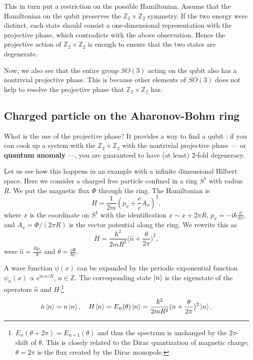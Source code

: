 \documentclass[
]{scrartcl}
\numberwithin{equation}{section}
\theoremstyle{definition}
\theoremstyle{definition}
\theoremstyle{definition}
\theoremstyle{definition}
\theoremstyle{remark}
\begin{document}
This in turn put a restriction on the possible Hamiltonian.
Assume that the Hamiltonian on the qubit preserves the \(\mathbb{Z}_2\times \mathbb{Z}_2\) symmetry.
If the two energy were distinct, each state should consist a one-dimensional representation with the projective phase, which contradicts with the above observation. Hence the projective action of \(\mathbb{Z}_2\times \mathbb{Z}_2\) is enough to ensure that the two states are degenerate.

Now, we also see that the entire group \(SO(3)\) acting on the qubit also has a nontrivial projective phase. This is because other elements of \(SO(3)\) does not help to resolve the projective phase that \(\mathbb{Z}_2\times \mathbb{Z}_2\) has.

\hypertarget{charged-particle-on-the-aharonov-bohm-ring}{%
\subsection{Charged particle on the Aharonov-Bohm ring}\label{charged-particle-on-the-aharonov-bohm-ring}}

What is the use of the projective phase?
It provides a way to find a qubit : if you can cook up a system with the \(\mathbb{Z}_2\times \mathbb{Z}_2\) with the nontrivial projective phase --- or \textbf{quantum anomaly} ---, you are guaranteed to have (at least) 2-fold degeneracy.

Let us see how this happens in an example with a infinite dimensional Hilbert space.
Here we consider a charged free particle confined in a ring \(S^1\) with radius \(R\). We put the magnetic flux \(\Phi\) through the ring.
The Hamiltonian is
\begin{equation}
  \label{eq:ABringHam0}
  H = \frac{1}{2m}(p_x + \frac{e}{c}A_x)^2,
\end{equation}
where \(x\) is the coordinate on \(S^1\) with the identification \(x \sim x + 2\pi R\), \(p_x = -\mathrm{i}\hbar \frac{\mathrm{d}}{\mathrm{d}x}\), and \(A_x = \Phi/(2\pi R)\) is the vector potential along the ring.
We rewrite this as
\begin{equation}
  \label{eq:ABringHam1}
  H = \frac{\hbar^2}{2mR^2}\bigl(\hat{n} + \frac{\theta}{2\pi} \bigr)^2,
\end{equation}
were \(\hat{n} = \frac{R p_x}{\hbar}\) and \(\theta = \frac{e \Phi}{\hbar c}\).

A wave function \(\psi(x)\) can be expanded by the periodic exponential function \(\psi_n(x) \propto e^{\mathrm{i}n\,x/R}\), \(n \in \mathbb{Z}\). The corresponding state \(\ket{n}\) is the eigenstate of the operators \(\hat{n}\) and \(H\):\footnote{\(E_n(\theta+2\pi) = E_{n+1}(\theta)\) and thus the spectrum is unchanged by the \(2\pi\)-shift of \(\theta\). This is closely related to the Dirac quantization of magnetic charge; \(\theta =2\pi\) is the flux created by the Dirac monopole.}
\begin{equation}
  \label{eq:nEigen}
  \hat{n} \ket{n} = n \ket{n},
  \quad H \ket{n} = E_n(\theta) \ket{n} = \frac{\hbar^2}{2mR^2}(n+\frac{\theta}{2\pi})^2 \ket{n}.
\end{equation}
\end{document}
